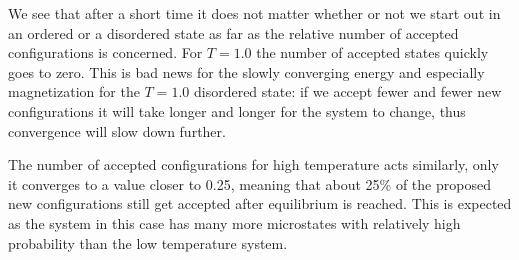 \documentclass[english, 12pt]{article}
\begin{document}
We see that after a short time it does not matter whether or not we start out in an ordered or a disordered state as far as the relative number of accepted configurations is concerned. For $T=1.0$ the number of accepted states quickly goes to zero. This is bad news for the slowly converging energy and especially magnetization for the $T=1.0$ disordered state: if we accept fewer and fewer new configurations it will take longer and longer for the system to change, thus convergence will slow down further.

The number of accepted configurations for high temperature acts similarly, only it converges to a value closer to 0.25, meaning that about 25\% of the proposed new configurations still get accepted after equilibrium is reached. This is expected as the system in this case has many more microstates with relatively high probability than the low temperature system. 
\end{document}
